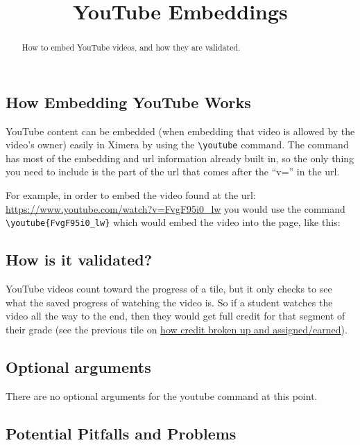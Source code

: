 \documentclass{ximera}
\title{YouTube Embeddings}
\begin{document}
\begin{abstract}
    How to embed YouTube videos, and how they are validated.
\end{abstract}
\maketitle

    \subsection*{How Embedding YouTube Works}
        YouTube content can be embedded (when embedding that video is allowed by the video's owner) easily in Ximera by using the \verb|\youtube| command. The command has most of the embedding and url information already built in, so the only thing you need to include is the part of the url that comes after the ``v='' in the url.
        
        For example, in order to embed the video found at the url: \url{https://www.youtube.com/watch?v=FvgF95i0_lw} you would use the command \verb|\youtube{FvgF95i0_lw}| which would embed the video into the page, like this:
        
    
    
    \subsection*{How is it validated?}
        YouTube videos count toward the progress of a tile, but it only checks to see what the saved progress of watching the video is. So if a student watches the video all the way to the end, then they would get full credit for that segment of their grade (see the previous tile on \href{https://xronos.clas.ufl.edu/examples/exampleCore/assignments/creditAllocation}{how credit broken up and assigned/earned}). 
        
        
    \subsection*{Optional arguments}
        There are no optional arguments for the youtube command at this point. 
    
    \subsection*{Potential Pitfalls and Problems}
\end{document}
